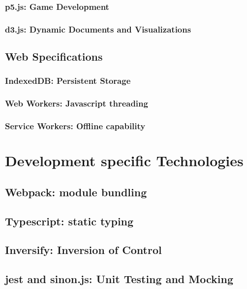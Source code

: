 \subsubsection{p5.js: Game Development}
\subsubsection{d3.js: Dynamic Documents and Visualizations}
\subsection{Web Specifications}
\subsubsection{IndexedDB: Persistent Storage}
\subsubsection{Web Workers: Javascript threading}
\subsubsection{Service Workers: Offline capability}
\section{Development specific Technologies}
\subsection{Webpack: module bundling}
\subsection{Typescript: static typing}
\subsection{Inversify: Inversion of Control}
\subsection{jest and sinon.js: Unit Testing and Mocking}